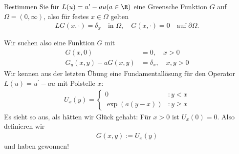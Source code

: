 
\begin{exercise}

Bestimmen Sie für $L(u) = u^{\prime} - au (a \in \R)$ eine Greensche Funktion
$G$ auf $\Omega = (0,\infty)$, also für festes $x \in \Omega$ gelten
\begin{align*}
  LG(x,\cdot) = \delta_x \quad \text{in } \Omega, \quad G(x,\cdot) = 0 \quad \text{auf } \partial\Omega.
\end{align*}

\end{exercise}


\begin{solution}

Wir suchen also eine Funktion $G$ mit
\begin{align*}
  G(x,0) &= 0, \quad x > 0 \\
  G_y(x,y) - aG(x,y) &= \delta_x, \quad x,y > 0
\end{align*}
Wir kennen aus der letzten Übung eine Fundamentallösung für den Operator $L(u) = u^{\prime} - au$
mit Polstelle $x$:
\begin{align*}
  U_{x}(y) = \begin{cases}
    0 &: y < x \\
    \exp(a(y-x)) &: y \geq x
  \end{cases}
\end{align*}
Es sieht so aus, als hätten wir Glück gehabt: Für $x > 0$ ist $U_x(0) = 0$.
Also definieren wir
\begin{align*}
  G(x,y) := U_x(y)
\end{align*}
und haben gewonnen!
\end{solution}

